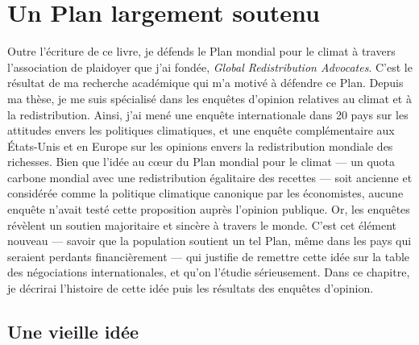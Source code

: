 \documentclass[a5paper,french]{memoir}
\begin{document}
\chapter{Un Plan largement soutenu\label{ch:soutien}}

Outre l'écriture de ce livre, je défends le Plan mondial pour le climat à travers l'association de plaidoyer que j'ai fondée, \textit{Global Redistribution Advocates}. 
C'est le résultat de ma recherche académique qui m'a motivé à défendre ce Plan. Depuis ma thèse, je me suis spécialisé dans les enquêtes d'opinion relatives au climat et à la redistribution. Ainsi, j'ai mené une enquête internationale dans 20 pays sur les attitudes envers les politiques climatiques, et une enquête complémentaire aux États-Unis et en Europe sur les opinions envers la redistribution mondiale des richesses. Bien que l'idée au cœur du Plan mondial pour le climat --- un quota carbone mondial avec une redistribution égalitaire des recettes --- soit ancienne et considérée comme la politique climatique canonique par les économistes, aucune enquête n'avait testé cette proposition auprès l'opinion publique. Or, les enquêtes révèlent un soutien majoritaire et sincère à travers le monde. C'est cet élément nouveau --- savoir que la population soutient un tel Plan, même dans les pays qui seraient perdants financièrement --- qui justifie de remettre cette idée sur la table des négociations internationales, et qu'on l'étudie sérieusement. Dans ce chapitre, je décrirai l'histoire de cette idée puis les résultats des enquêtes d'opinion.

\section{Une vieille idée} 
\end{document}
